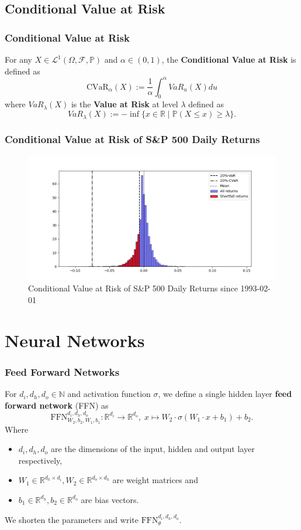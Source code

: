 \documentclass[serif]{beamer}
\def\R{{\mathbb R}}
\def\P{{\mathbb P}}
\def\N{{\mathbb N}}
\def\O{{\Omega}}
\def\cF{{\mathcal F}}
\def\L{{\mathcal L}}
\begin{document}
\subsection{Conditional Value at Risk}

\begin{frame}
    \frametitle{Conditional Value at Risk}
    For any $X \in \L^1 (\O, \cF, \P)$ and $\alpha \in (0,1)$,
    the \textbf{Conditional Value at Risk}
    is defined as
    $$\text{CVaR}_\alpha (X) := \frac{1}{\alpha} \int_0^\alpha VaR_u (X) du$$
    where $VaR_\lambda (X)$ is the \textbf{Value at Risk} at level $\lambda$ defined as
    $$VaR_\lambda (X) := - \inf \{ x \in \R \; | \; \P (X \leq x) \geq \lambda \}.$$
\end{frame}

\begin{frame}
    \frametitle{Conditional Value at Risk of S\&P 500 Daily Returns}
    \begin{figure}
        \includegraphics[width=1.0\textwidth]{./images/cvar_sp500_example.png}
        \caption{Conditional Value at Risk of S\&P 500 Daily Returns since 1993-02-01}
    \end{figure}
\end{frame}

\section{Neural Networks}

\begin{frame}
    \frametitle{Feed Forward Networks}
    For $d_i, d_h, d_o \in \N$
    and activation function $\sigma$,
    we define a single hidden layer \textbf{feed forward network} (FFN) as
    \[
        \text{FFN}_{W_2, b_2, W_1, b_1}^{d_i, d_h, d_o} : \R^{d_i} \to \R^{d_o}, \;
        x \mapsto W_2 \cdot \sigma (W_1 \cdot x + b_1) + b_2.
    \]
    Where
    \begin{itemize}
        \item $d_i, d_h, d_o$ are the dimensions of the input, hidden and output layer respectively,
        \item $W_1 \in \R^{d_h \times d_i}, W_2 \in \R^{d_o \times d_h}$ are weight matrices and
        \item $b_1 \in \R^{d_h}, b_2 \in \R^{d_o}$ are bias vectors.
    \end{itemize}
    We shorten the parameters and write $\text{FFN}_\theta^{d_i, d_h, d_o}$.
\end{frame}
\end{document}
